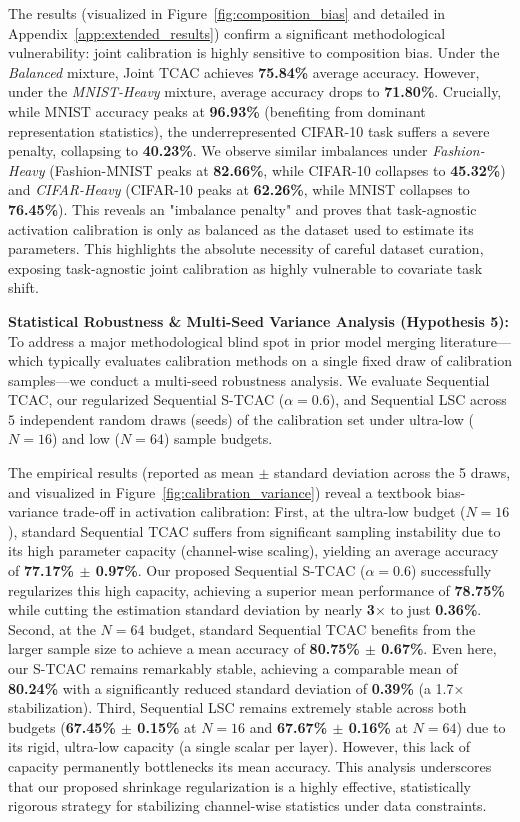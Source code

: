 \documentclass{article}
\theoremstyle{plain}
\theoremstyle{definition}
\theoremstyle{remark}
\begin{document}
The results (visualized in Figure~\ref{fig:composition_bias} and detailed in Appendix~\ref{app:extended_results}) confirm a significant methodological vulnerability: joint calibration is highly sensitive to composition bias. Under the \textit{Balanced} mixture, Joint TCAC achieves \textbf{75.84\%} average accuracy. However, under the \textit{MNIST-Heavy} mixture, average accuracy drops to \textbf{71.80\%}. Crucially, while MNIST accuracy peaks at \textbf{96.93\%} (benefiting from dominant representation statistics), the underrepresented CIFAR-10 task suffers a severe penalty, collapsing to \textbf{40.23\%}. We observe similar imbalances under \textit{Fashion-Heavy} (Fashion-MNIST peaks at \textbf{82.66\%}, while CIFAR-10 collapses to \textbf{45.32\%}) and \textit{CIFAR-Heavy} (CIFAR-10 peaks at \textbf{62.26\%}, while MNIST collapses to \textbf{76.45\%}). This reveals an "imbalance penalty" and proves that task-agnostic activation calibration is only as balanced as the dataset used to estimate its parameters. This highlights the absolute necessity of careful dataset curation, exposing task-agnostic joint calibration as highly vulnerable to covariate task shift.

\textbf{Statistical Robustness \& Multi-Seed Variance Analysis (Hypothesis 5):}
To address a major methodological blind spot in prior model merging literature—which typically evaluates calibration methods on a single fixed draw of calibration samples—we conduct a multi-seed robustness analysis. We evaluate Sequential TCAC, our regularized Sequential S-TCAC ($\alpha=0.6$), and Sequential LSC across $5$ independent random draws (seeds) of the calibration set under ultra-low ($N=16$) and low ($N=64$) sample budgets. 

The empirical results (reported as mean $\pm$ standard deviation across the 5 draws, and visualized in Figure~\ref{fig:calibration_variance}) reveal a textbook bias-variance trade-off in activation calibration:
First, at the ultra-low budget ($N=16$), standard Sequential TCAC suffers from significant sampling instability due to its high parameter capacity (channel-wise scaling), yielding an average accuracy of \textbf{77.17\% $\pm$ 0.97\%}. Our proposed Sequential S-TCAC ($\alpha=0.6$) successfully regularizes this high capacity, achieving a superior mean performance of \textbf{78.75\%} while cutting the estimation standard deviation by nearly \textbf{3$\times$} to just \textbf{0.36\%}.
Second, at the $N=64$ budget, standard Sequential TCAC benefits from the larger sample size to achieve a mean accuracy of \textbf{80.75\% $\pm$ 0.67\%}. Even here, our S-TCAC remains remarkably stable, achieving a comparable mean of \textbf{80.24\%} with a significantly reduced standard deviation of \textbf{0.39\%} (a 1.7$\times$ stabilization).
Third, Sequential LSC remains extremely stable across both budgets (\textbf{67.45\% $\pm$ 0.15\%} at $N=16$ and \textbf{67.67\% $\pm$ 0.16\%} at $N=64$) due to its rigid, ultra-low capacity (a single scalar per layer). However, this lack of capacity permanently bottlenecks its mean accuracy.
This analysis underscores that our proposed shrinkage regularization is a highly effective, statistically rigorous strategy for stabilizing channel-wise statistics under data constraints.
\end{document}
